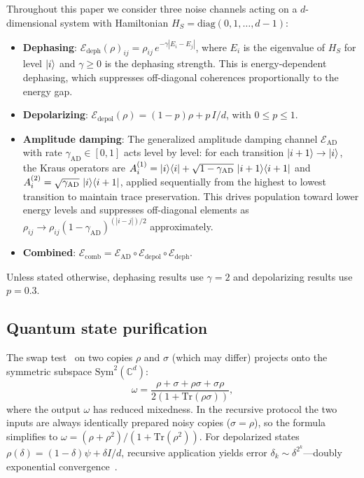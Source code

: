 \documentclass[prx,twocolumn,superscriptaddress,longbibliography,floatfix]{revtex4-2}
\begin{document}
Throughout this paper we consider three noise channels acting on a $d$-dimensional system with Hamiltonian $H_S = \mathrm{diag}(0,1,\ldots,d-1)$:
\begin{itemize}
\item \textbf{Dephasing}: $\mathcal{E}_\mathrm{deph}(\rho)_{ij} = \rho_{ij}\, e^{-\gamma|E_i - E_j|}$, where $E_i$ is the eigenvalue of $H_S$ for level $\ket{i}$ and $\gamma \geq 0$ is the dephasing strength.  This is energy-dependent dephasing, which suppresses off-diagonal coherences proportionally to the energy gap.
\item \textbf{Depolarizing}: $\mathcal{E}_\mathrm{depol}(\rho) = (1-p)\rho + p\, I/d$, with $0 \leq p \leq 1$.
\item \textbf{Amplitude damping}: The generalized amplitude damping channel $\mathcal{E}_\mathrm{AD}$ with rate $\gamma_\mathrm{AD} \in [0,1]$ acts level by level: for each transition $\ket{i+1} \to \ket{i}$, the Kraus operators are $A_i^{(1)} = \ket{i}\!\bra{i} + \sqrt{1-\gamma_\mathrm{AD}}\,\ket{i+1}\!\bra{i+1}$ and $A_i^{(2)} = \sqrt{\gamma_\mathrm{AD}}\,\ket{i}\!\bra{i+1}$, applied sequentially from the highest to lowest transition to maintain trace preservation.
This drives population toward lower energy levels and suppresses off-diagonal elements as $\rho_{ij} \to \rho_{ij}(1-\gamma_\mathrm{AD})^{(|i-j|)/2}$ approximately.
\item \textbf{Combined}: $\mathcal{E}_\mathrm{comb} = \mathcal{E}_\mathrm{AD} \circ \mathcal{E}_\mathrm{depol} \circ \mathcal{E}_\mathrm{deph}$.
\end{itemize}
Unless stated otherwise, dephasing results use $\gamma = 2$ and depolarizing results use $p = 0.3$.

\subsection{Quantum state purification}
\label{sec:purification_review}

The swap test~\cite{Childs2025,Barenco1997} on two copies $\rho$ and $\sigma$ (which may differ) projects onto the symmetric subspace $\mathrm{Sym}^2(\mathbb{C}^d)$:
\begin{equation}
\omega = \frac{\rho + \sigma + \rho\sigma + \sigma\rho}{2(1 + \mathrm{Tr}(\rho\sigma))},
\label{eq:swap_gadget}
\end{equation}
where the output $\omega$ has reduced mixedness.
In the recursive protocol the two inputs are always identically prepared noisy copies ($\sigma = \rho$), so the formula simplifies to $\omega = (\rho + \rho^2)/(1 + \mathrm{Tr}(\rho^2))$.
For depolarized states $\rho(\delta) = (1-\delta)\psi + \delta I/d$, recursive application yields error $\delta_k \sim \delta^{2^k}$---doubly exponential convergence~\cite{Childs2025}.
\end{document}
